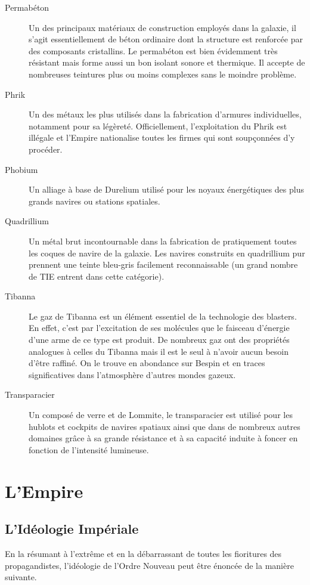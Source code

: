 \documentclass[twoside]{article}
\begin{document}
\begin{description}
	\item[Permabéton] Un des principaux matériaux de construction employés dans la galaxie, il s'agit essentiellement de béton ordinaire dont la structure est renforcée par des composants cristallins. Le permabéton est bien évidemment très résistant mais forme aussi un bon isolant sonore et thermique. Il accepte de nombreuses teintures plus ou moins complexes sans le moindre problème.
	\item[Phrik] Un des métaux les plus utilisés dans la fabrication d'armures individuelles, notamment pour sa légèreté. Officiellement, l'exploitation du Phrik est illégale et l'Empire nationalise toutes les firmes qui sont soupçonnées d'y procéder.
	\item[Phobium] Un alliage à base de Durelium utilisé pour les noyaux énergétiques des plus grands navires ou stations spatiales.
	\item[Quadrillium] Un métal brut incontournable dans la fabrication de pratiquement toutes les coques de navire de la galaxie. Les navires construits en quadrillium pur prennent une teinte bleu-gris facilement reconnaissable (un grand nombre de TIE entrent dans cette catégorie).
	\item[Tibanna] Le gaz de Tibanna est un élément essentiel de la technologie des blasters. En effet, c'est par l'excitation de ses molécules que le faisceau d'énergie d'une arme de ce type est produit. De nombreux gaz ont des propriétés analogues à celles du Tibanna mais il est le seul à n'avoir aucun besoin d'être raffiné. On le trouve en abondance sur Bespin et en traces significatives dans l'atmosphère d'autres mondes gazeux.
	\item[Transparacier] Un composé de verre et de Lommite, le transparacier est utilisé pour les hublots et cockpits de navires spatiaux ainsi que dans de nombreux autres domaines grâce à sa grande résistance et à sa capacité induite à foncer en fonction de l'intensité lumineuse.
\end{description}


\section{L'Empire}

\subsection{L'Idéologie Impériale}
En la résumant à l'extrême et en la débarrassant de toutes les fioritures des propagandistes, l'idéologie de l'Ordre Nouveau peut être énoncée de la manière suivante. 
\end{document}
